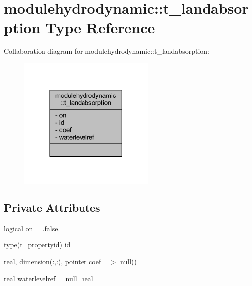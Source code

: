 \hypertarget{structmodulehydrodynamic_1_1t__landabsorption}{}\section{modulehydrodynamic\+:\+:t\+\_\+landabsorption Type Reference}
\label{structmodulehydrodynamic_1_1t__landabsorption}


Collaboration diagram for modulehydrodynamic\+:\+:t\+\_\+landabsorption\+:\nopagebreak
\begin{figure}[H]
\begin{center}
\leavevmode
\includegraphics[width=189pt]{structmodulehydrodynamic_1_1t__landabsorption__coll__graph}
\end{center}
\end{figure}
\subsection*{Private Attributes}
\begin{DoxyCompactItemize}
\item 
logical \mbox{\hyperlink{structmodulehydrodynamic_1_1t__landabsorption_a13958480deca36ffff0ff53316a038df}{on}} = .false.
\item 
type(t\+\_\+propertyid) \mbox{\hyperlink{structmodulehydrodynamic_1_1t__landabsorption_a2dd59e559c9fa8503361536719f27675}{id}}
\item 
real, dimension(\+:,\+:), pointer \mbox{\hyperlink{structmodulehydrodynamic_1_1t__landabsorption_acc08f142c4315d17f110c8a03496b795}{coef}} =$>$ null()
\item 
real \mbox{\hyperlink{structmodulehydrodynamic_1_1t__landabsorption_a3c4ae8860b51f49531839eaa648c79e1}{waterlevelref}} = null\+\_\+real
\end{DoxyCompactItemize}


